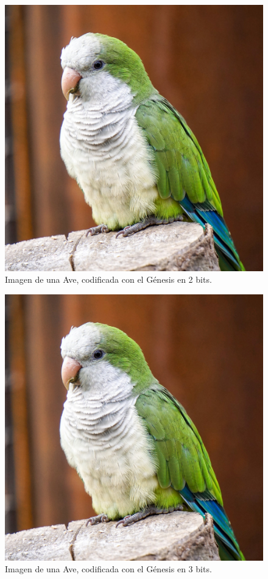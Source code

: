 \documentclass[conference]{IEEEtran}
\begin{document}
    \begin{figure}[H]
    \centering
    \includegraphics[width=0.9\linewidth]{image/birb2.png}
\caption{Imagen de una Ave, codificada con el Génesis en 2 bits.}
\end{figure}

    \begin{figure}[H]
    \centering
    \includegraphics[width=0.9\linewidth]{image/birb3.png}
\caption{Imagen de una Ave, codificada con el Génesis en 3 bits.}
\end{figure}
\end{document}
